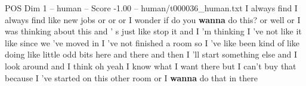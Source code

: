 \begin{textsample}{POS Dim 1 – human – Score -1.00 – human/t000036\_human.txt}  \label{ex:f1_pos_013}
I always find I always find like new jobs or or or I wonder if do you \textbf{wanna} do this? or well or I was thinking about this and ' s just like stop it and I 'm thinking I 've not like it like since we 've moved in I 've not finished a room so I 've like been kind of like doing like little odd bits here and there and then I 'll start something else and I look around and I think oh yeah I know what I want there but I can't buy that because I 've started on this other room or I \textbf{wanna} do that in there

\end{textsample}
